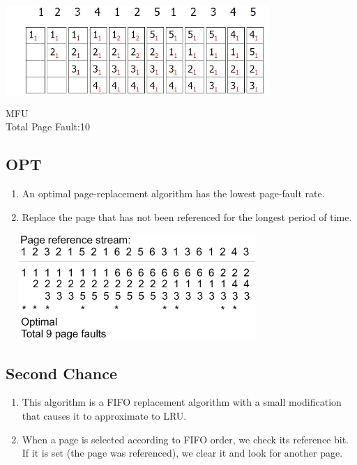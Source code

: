 \documentclass[12pt]{article}
\begin{document}
			\centering\includegraphics[width=10cm,height=4cm]{MFU_1.JPG}\\
			MFU \\Total Page Fault:10
			\begin{flushleft}
				\subsection{OPT}
				\begin{enumerate}
					\item An optimal page-replacement algorithm has the lowest page-fault rate.
					\item Replace the page that has not been referenced for the longest period of time.
				\end{enumerate}
			\end{flushleft}
			
		
		\centering\includegraphics[width=10cm,height=4cm]{OPT_1.png}
		\pagebreak
		\begin{flushleft}
			\subsection{Second Chance}
			\begin{enumerate}
				\item This algorithm is a FIFO replacement algorithm with a small modification that causes it to approximate to LRU.
				\item When a page is selected according to FIFO order, we check its reference bit. If it is set (the page was referenced), we clear it and look for another page.
				
			\end{enumerate}
		\end{flushleft}
		
\end{document}
